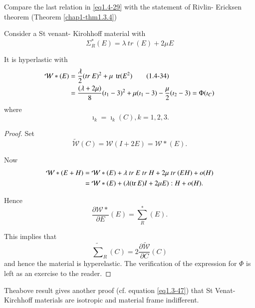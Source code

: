 \begin{remark}\label{chap1-rem1.4.3}%
Compare the last relation in \eqref{eq1.4-29} with the statement of Rivlin-
Ericksen theorem (Theorem \ref{chap1-thm1.3.4}) 
\end{remark}

\begin{theorem}\label{chap1-thm1.4.7}%
  Consider a St venant- Kirohhoff material with 
  \begin{equation*}
    \Sigma^*_R(E)= \lambda ~tr~ (E)+ 2\mu E\tag{1.4-33}\label{eq1.4-33}
  \end{equation*}
  
  It is hyperlastic with
  \begin{align*}
    \mathcal{W} * (E) &= \frac{\lambda}{2} (tr~ E)^2 + \mu ~ \operatorname{tr} (E^2) \tag
            {1.4-34}\label{eq1.4-34}\\  
            &= \frac{(\lambda + 2\mu)}{8} (\imath_1-3)^2 + \mu (\imath_1 -3)
            -\frac{\mu}{2} (\imath_2 -3) = \Phi (\imath_C) 
  \end{align*}
  where 
  $$
  \imath_k = \imath_k (C), k=1,2,3.
  $$
\end{theorem}

\begin{proof}
  Set
  $$
  \tilde{\mathcal{W}} (C) = \mathcal{W} (I + 2E) = \mathcal{W}* (E).
  $$

Now 
\begin{align*}
  \mathcal{W}* (E+H) &= \mathcal{W}* (E) + \lambda ~tr~ E ~tr~ H + 2 \mu
  ~tr~ (EH) + o(H)\\ 
  &= \mathcal{W}*(E)+ (\lambda (\operatorname{tr} E) I + 2\mu E): H + o(H). 
\end{align*}

Hence 
$$
\frac{\partial \mathcal{W}*}{\partial E} (E) = \sum^*_R (E). 
$$

This implies that 
$$
\tilde{\sum}_R (C) = 2 \frac{\partial \tilde{\mathcal{W}}}{\partial C}(C)
$$
and hence the material is hyperelastic. The verification of the
expression for $\Phi$ is left as an exercise to the reader. 
\end{proof}

\begin{remark}\label{chap1-rem1.4.4}%
The\pageoriginale above result gives another proof (cf. equation\break
\eqref{eq1.3-47}) that St 
  Venat-Kirchhoff materials are isotropic and material frame
  indifferent. 
\end{remark}

